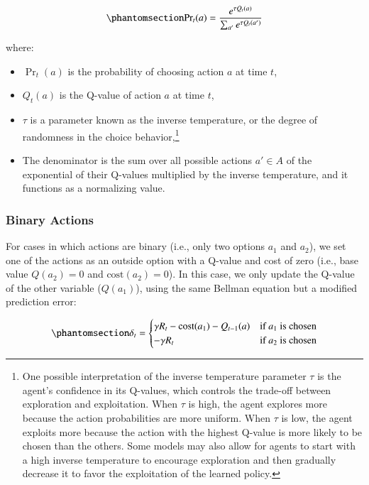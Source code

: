 \documentclass[
  number,
  preprint,
  3p,
  onecolumn]{elsarticle}
\begin{document}
\begin{equation}\phantomsection\label{eq-softmax}{
\text{Pr}_t(a) = \frac{e^{\tau Q_t(a)}}{\sum_{a'} e^{\tau Q_t(a')}}
}\end{equation}

where:

\begin{itemize}
\item
  \(\Pr_t(a)\) is the probability of choosing action \(a\) at time
  \(t\),
\item
  \(Q_t(a)\) is the Q-value of action \(a\) at time \(t\),
\item
  \(\tau\) is a parameter known as the inverse temperature, or the
  degree of randomness in the choice behavior,\footnote{One possible
    interpretation of the inverse temperature parameter \(\tau\) is the
    agent's confidence in its Q-values, which controls the trade-off
    between exploration and exploitation. When \(\tau\) is high, the
    agent explores more because the action probabilities are more
    uniform. When \(\tau\) is low, the agent exploits more because the
    action with the highest Q-value is more likely to be chosen than the
    others. Some models may also allow for agents to start with a high
    inverse temperature to encourage exploration and then gradually
    decrease it to favor the exploitation of the learned policy.}
\item
  The denominator is the sum over all possible actions \(a' \in A\) of
  the exponential of their Q-values multiplied by the inverse
  temperature, and it functions as a normalizing value.
\end{itemize}

\subsubsection{Binary Actions}\label{binary-actions}

For cases in which actions are binary (i.e., only two options \(a_1\)
and \(a_2\)), we set one of the actions as an outside option with a
Q-value and cost of zero (i.e., base value \(Q(a_2)=0\) and
\(\text{cost}(a_2)=0\)). In this case, we only update the Q-value of the
other variable (\(Q(a_1)\)), using the same Bellman equation but a
modified prediction error:

\begin{equation}\phantomsection\label{eq-state-free}{
\delta_t = 
\begin{cases}
\gamma R_t - \text{cost}(a_1) - Q_{t-1}(a) & \text{if } a_1 \text{ is chosen} \\
-\gamma R_t & \text{if } a_2 \text{ is chosen}
\end{cases}
}\end{equation}
\end{document}
